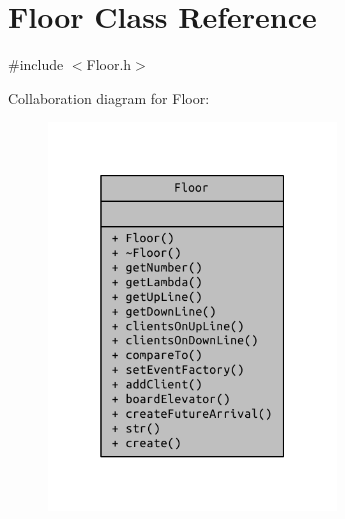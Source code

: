 \hypertarget{class_floor}{}\section{Floor Class Reference}
\label{class_floor}


{\ttfamily \#include $<$Floor.\+h$>$}



Collaboration diagram for Floor\+:
\nopagebreak
\begin{figure}[H]
\begin{center}
\leavevmode
\includegraphics[width=217pt]{class_floor__coll__graph}
\end{center}
\end{figure}
